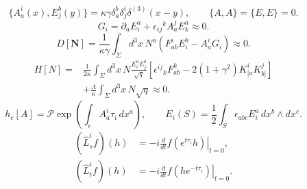 \documentclass{article}
\begin{document}
\begin{equation}
\{A_a^i(x),E^b_j(y)\}=\kappa\gamma\delta_a^b\delta^i_j\delta^{(3)}(x-y),\qquad\{A,A\}=\{E,E\}=0.
\tag{K5}
\end{equation}
\begin{equation}
G_i=\partial_aE^a_i+\epsilon_{ij}{}^kA_a^jE^a_k\approx0.
\tag{K6}
\end{equation}
\begin{equation}
D[\mathbf N]=\frac1{\kappa\gamma}\int_\Sigma d^3x\,N^a(F_{ab}^iE^b_i-A_a^iG_i)\approx0.
\tag{K7}
\end{equation}
\begin{equation}
\begin{aligned}
H[N]={}&\frac1{2\kappa}\int_\Sigma d^3x\,N\frac{E^a_iE^b_j}{\sqrt q}
\left[\epsilon^{ij}{}_kF_{ab}^k-2(1+\gamma^2)K_{[a}^iK_{b]}^j\right]\\
&+\frac\Lambda\kappa\int_\Sigma d^3x\,N\sqrt q\approx0.
\end{aligned}
\tag{K8}
\end{equation}
\begin{equation}
h_e[A]=\mathcal P\exp\left(\int_e A_a^i\tau_i\,dx^a\right),\qquad E_i(S)=\frac12\int_S\epsilon_{abc}E_i^a\,dx^b\wedge dx^c.
\tag{H1}
\end{equation}
\begin{equation}
\begin{aligned}
(\hat L_s^if)(h)&=-i\left.\frac d{dt}f(e^{t\tau_i}h)\right|_{t=0},\\
(\hat L_t^if)(h)&=-i\left.\frac d{dt}f(he^{-t\tau_i})\right|_{t=0}.
\end{aligned}
\tag{H2}
\end{equation}
\end{document}
